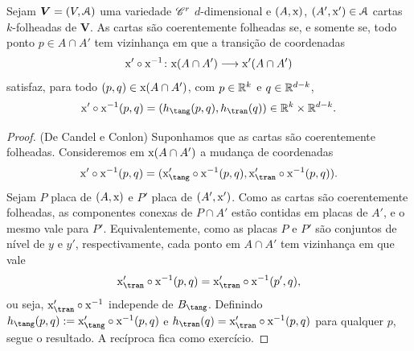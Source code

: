 \begin{prop}
Sejam $\bm V = (V,\mathcal{A})$ uma variedade $\mathscr{C}^r$ $d$-dimensional e $(A,\mathrm{x})$, $(A',\mathrm{x}') \in \mathcal{A}$ cartas $k$-folheadas de $\bm V$. As cartas são coerentemente folheadas se, e somente se, todo ponto $p \in A \cap A'$ tem vizinhança em que a transição de coordenadas
	\begin{equation*}
	\mathrm{x}' \circ \mathrm{x}^{-1}\colon \mathrm{x}(A \cap A') \longrightarrow \mathrm{x}'(A \cap A')
	\end{equation*}
satisfaz, para todo $(p,q) \in \mathrm{x}(A \cap A')$, com $p \in \mathbb{R}^{k}$ e $q \in \mathbb{R}^{d-k}$,
	\begin{equation*}
	\x' \circ \x\inv(p,q) = (h_\tang(p,q),h_\tran(q)) \in \R^{k} \times \R^{d-k}.
	\end{equation*}
\end{prop}
\begin{proof}
(De Candel e Conlon)
Suponhamos que as cartas são coerentemente folheadas. Consideremos em $\mathrm{x}(A \cap A')$ a mudança de coordenadas
	\begin{equation*}
	\x' \circ \x\inv(p,q) = (\x'_\tang \circ \x\inv(p,q),\x'_\tran \circ \x\inv(p,q)).
	\end{equation*}
Sejam $P$ placa de $(A,\mathrm{x})$ e $P'$ placa de $(A',\mathrm{x}')$. Como as cartas são coerentemente folheadas, as componentes conexas de $P \cap A'$ estão contidas em placas de $A'$, e o mesmo vale para $P'$. Equivalentemente, como as placas $P$ e $P'$ são conjuntos de nível de $y$ e $y'$, respectivamente, cada ponto em $A \cap A'$ tem vizinhança em que vale
	\begin{equation*}
	\x'_\tran \circ \x\inv(p,q) = \x'_\tran \circ \x\inv(p',q),
	\end{equation*}
ou seja, $\x'_\tran \circ \x\inv$ independe de $B_\tang$. Definindo $h_\tang(p,q) := \x'_\tang \circ \x\inv(p,q)$ e $h_\tran(q) = \x'_\tran \circ \x\inv(p,q)$ para qualquer $p$, segue o resultado. A recíproca fica como exercício.
\end{proof}


